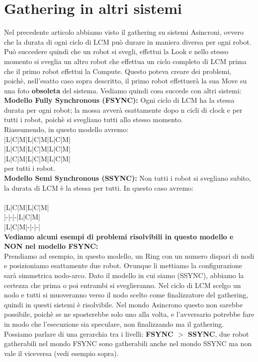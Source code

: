 \section{Gathering in altri sistemi}
Nel precedente articolo abbiamo visto il gathering su sistemi Asincroni, ovvero che la durata di ogni ciclo di LCM può durare in maniera diversa per ogni robot. Può succedere quindi che un robot si svegli, effettui la Look e nello stesso momento si sveglia un altro robot che effettua un ciclo completo di LCM prima che il primo robot effettui la Compute. Questo poteva creare dei problemi, poichè, nell'esatto caso sopra descritto, il primo robot effettuerà la sua Move su una foto \textbf{obsoleta} del sistema. Vediamo quindi cosa succede con altri sistemi:\\
\textbf{Modello Fully Synchronous (FSYNC):} Ogni ciclo di LCM ha la stessa durata per ogni robot; la mossa avverà esattamente dopo n cicli di clock e per tutti i robot, poichè si svegliano tutti allo stesso momento.\\
Riassumendo, in questo modello avremo:\\
|L|C|M|L|C|M|L|C|M|\\
|L|C|M|L|C|M|L|C|M|\\
|L|C|M|L|C|M|L|C|M|\\
per tutti i robot.\\
\textbf{Modello Semi Synchronous (SSYNC):} Non tutti i robot si svegliano subito, la durata di LCM è la stessa per tutti. In questo caso avremo:\\\\
|L|C|M|L|C|M|\\
|-|-|-|L|C|M|\\
|L|C|M|-|-|-|\\
\textbf{Vediamo alcuni esempi di problemi risolvibili in questo modello e NON nel modello FSYNC:}\\
Prendiamo ad esempio, in questo modello, un Ring con un numero dispari di nodi e posizioniamo esattamente due robot. Ovunque li mettiamo la configurazione sarà simmetrica nodo-arco. Dato il modello in cui siamo (SSYNC), abbiamo la certezza che prima o poi entrambi si sveglieranno. Nel ciclo di LCM scelgo un nodo e tutti si muoveranno verso il nodo scelto come finalizzatore del gathering, quindi in questi sistemi è risolvibile. Nel mondo Asincrono questo non sarebbe possibile, poichè se ne sposterebbe solo uno alla volta, e l'avversario potrebbe fare in modo che l'esecuzione sia speculare, non finalizzando ma il gathering.\\
Possiamo parlare di una gerarchia tra i livelli: \textbf{FSYNC $>$ SSYNC}, due robot gatherabili nel mondo FSYNC sono gatherabili anche nel mondo SSYNC ma non vale il viceversa (vedi esempio sopra).\\
